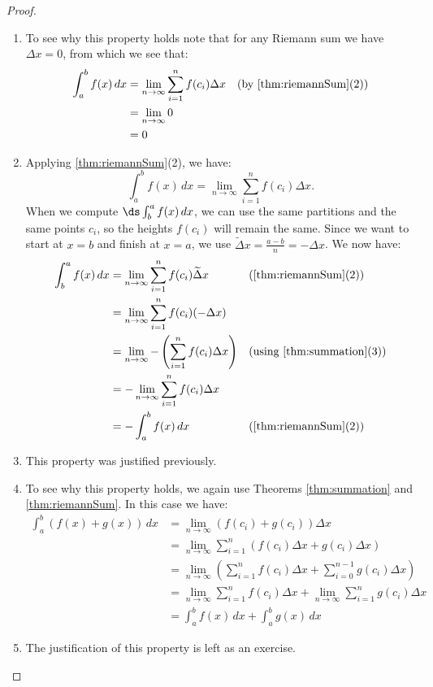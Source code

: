 \begin{proof}\label{pf:defintprop}
\begin{enumerate}
\item To see why this property holds note that for any Riemann sum we have $\Delta x=0$, from which we see that: 
\begin{align*}
\int_a^b f(x)\,dx
&=\lim_{n\to\infty}\sum_{i=1}^n f(c_i)\Delta x
\quad \text{(by \autoref{thm:riemannSum}(2))}\\
&=\lim_{n\to\infty} 0\\
&=0\\
\end{align*}

\item Applying \autoref{thm:riemannSum}(2), we have:
\[\int_a^b f(x)\,dx=\lim_{n\to\infty}\sum_{i=1}^n f(c_i)\Delta x.\]
When we compute $\ds\int_b^a f(x)\,dx$, we can use the same partitions and the same points $c_i$, so the heights $f(c_i)$ will remain the same. Since we want to start at $x=b$ and finish at $x=a$, we use $\widetilde\Delta x=\frac{a-b}n=-\Delta x$. We now have:
\begin{align*}
\int_b^a f(x)\,dx
&=\lim_{n\to\infty} \sum_{i=1}^n f(c_i)\widetilde\Delta x
&&\text{(\autoref{thm:riemannSum}(2))}\\
&=\lim_{n\to\infty} \sum_{i=1}^n f(c_i)(-\Delta x)\\
&=\lim_{n\to\infty} -\left(\sum_{i=1}^n f(c_i)\Delta x\right)
&&\text{(using \autoref{thm:summation}(3))}\\
&=-\lim_{n\to\infty} \sum_{i=1}^n f(c_i)\Delta x\\
&=-\int_a^b f(x)\,dx &&\text{(\autoref{thm:riemannSum}(2))}
\end{align*}

\item This property was justified previously.

\item To see why this property holds, we again use Theorems \ref{thm:summation} and \ref{thm:riemannSum}. In this case we have:
\begin{align*}
\int_a^b(f(x)+g(x))\,dx
&=\lim_{n\to\infty}(f(c_i)+g(c_i))\Delta x\\
&=\lim_{n\to\infty} \sum_{i=1}^n (f(c_i)\Delta x+g(c_i)\Delta x)\\
&=\lim_{n\to\infty}\left(\sum_{i=1}^n f(c_i)\Delta x
+\sum_{i=0}^{n-1} g(c_i)\Delta x\right)\\
&=\lim_{n\to\infty}\sum_{i=1}^n f(c_i)\Delta x
+\lim_{n\to\infty}\sum_{i=1}^n g(c_i)\Delta x\\
&=\int_a^b f(x)\,dx+\int_a^bg(x)\,dx
\end{align*}

\item The justification of this property is left as an exercise.\qedhere
\end{enumerate}
\end{proof}

